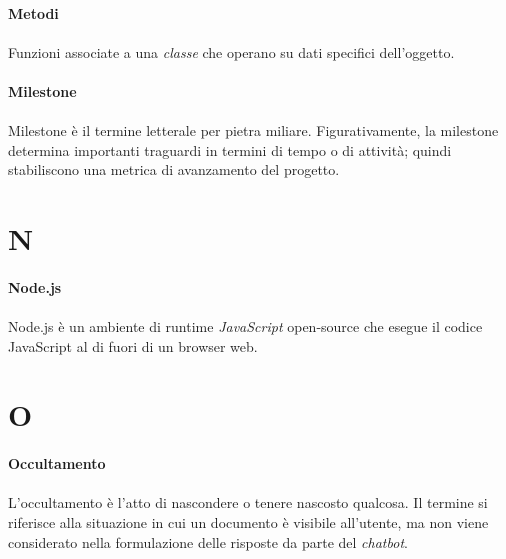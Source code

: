 \documentclass[10pt, a4paper]{article}
\begin{document}
\vspace{2em}
\paragraph{Metodi}\noindent\hrulefill
\paragraph{}Funzioni associate a una \textit{classe\pg} che operano su dati specifici dell'oggetto.


\vspace{2em}
\paragraph{Milestone}\noindent\hrulefill
\paragraph{}Milestone è il termine letterale per pietra miliare. Figurativamente, la milestone determina importanti traguardi in termini di tempo o di attività; quindi stabiliscono una metrica di avanzamento del progetto.




\newpage
\section{N}
\vspace{2em}
\paragraph{Node.js}\noindent\hrulefill
\paragraph{}Node.js è un ambiente di runtime \textit{JavaScript\pg} open-source che esegue il codice JavaScript al di fuori di un browser web.


\newpage
\section{O}

\vspace{2em}
\paragraph{Occultamento}\noindent\hrulefill
\paragraph{}L’occultamento è l’atto di nascondere o tenere nascosto qualcosa. Il termine si riferisce alla situazione in cui un documento è visibile all’utente, ma non viene considerato nella formulazione delle risposte da parte del \textit{chatbot\pg}.
\end{document}
